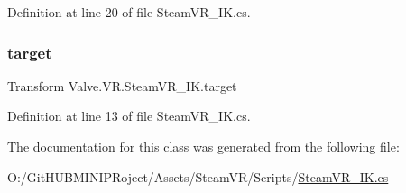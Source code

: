 Definition at line 20 of file Steam\+V\+R\+\_\+\+I\+K.\+cs.

\mbox{\label{class_valve_1_1_v_r_1_1_steam_v_r___i_k_ae00d693d3094a77dff1231324c32b193}} 
\subsubsection{\texorpdfstring{target}{target}}
{\footnotesize\ttfamily Transform Valve.\+V\+R.\+Steam\+V\+R\+\_\+\+I\+K.\+target}



Definition at line 13 of file Steam\+V\+R\+\_\+\+I\+K.\+cs.



The documentation for this class was generated from the following file\+:\begin{DoxyCompactItemize}
\item 
O\+:/\+Git\+H\+U\+B\+M\+I\+N\+I\+P\+Roject/\+Assets/\+Steam\+V\+R/\+Scripts/\mbox{\hyperlink{_steam_v_r___i_k_8cs}{Steam\+V\+R\+\_\+\+I\+K.\+cs}}\end{DoxyCompactItemize}
